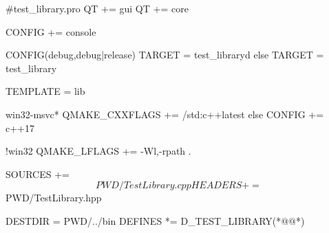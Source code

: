 \label{f000012}    %
\FloatBarrier                                  %
\begin{thebookfilesourceone}[escapeinside={(*@}{@*)},
caption=GoodLuck,
title=\filesourcenumbernameone \thefilesourcenumber
]
#test_library.pro
QT += gui
QT += core

CONFIG += console

CONFIG(debug,debug|release){
    TARGET = test_libraryd
}else{
    TARGET = test_library
}

TEMPLATE = lib

win32-msvc*{
    QMAKE_CXXFLAGS += /std:c++latest
}else{
    CONFIG += c++17
}

!win32 {
    QMAKE_LFLAGS += -Wl,-rpath .
}

SOURCES += $$PWD/TestLibrary.cpp
HEADERS += $$PWD/TestLibrary.hpp

DESTDIR =  $$PWD/../bin
DEFINES *= D_TEST_LIBRARY(*@\marginpar[\hfill\setlength\fboxsep{2pt}\fbox{\footnotesize{\kaishu\parbox{1em}{\setlength{\baselineskip}{2pt}\filesourcenumbernameone}}\footnotesize{\thefilesourcenumber}}]{\setlength\fboxsep{2pt}\fbox{\footnotesize{\kaishu\parbox{1em}{\setlength{\baselineskip}{2pt}\filesourcenumbernameone}}\footnotesize{\thefilesourcenumber}}}@*)\end{thebookfilesourceone}          %
\addtocounter{lstlisting}{-1}   %


